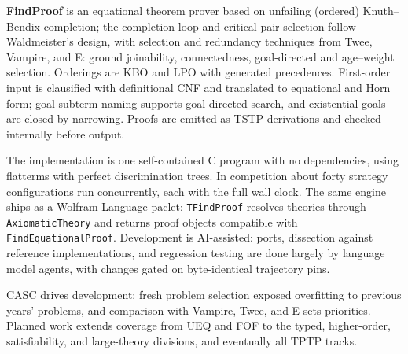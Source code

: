 
{\bf FindProof} \cite{Mur26} is an equational theorem prover based on
unfailing (ordered) Knuth--Bendix completion; the completion loop and
critical-pair selection follow Waldmeister's design, with selection and
redundancy techniques from Twee, Vampire, and E: ground joinability,
connectedness, goal-directed and age--weight selection.  Orderings are KBO
and LPO with generated precedences.  First-order input is clausified with
definitional CNF and translated to equational and Horn form; goal-subterm
naming supports goal-directed search, and existential goals are closed by
narrowing.  Proofs are emitted as TSTP derivations and checked internally
before output.

The implementation is one self-contained C program with no dependencies,
using flatterms with perfect discrimination trees.  In competition about
forty strategy configurations run concurrently, each with the full wall
clock.  The same engine ships as a Wolfram Language paclet:
\texttt{TFindProof} resolves theories through \texttt{AxiomaticTheory} and
returns proof objects compatible with \texttt{FindEquationalProof}.
Development is AI-assisted: ports, dissection against reference
implementations, and regression testing are done largely by language model
agents, with changes gated on byte-identical trajectory pins.

CASC drives development: fresh problem selection exposed overfitting to
previous years' problems, and comparison with Vampire, Twee, and E sets
priorities.  Planned work extends coverage from UEQ and FOF to the typed,
higher-order, satisfiability, and large-theory divisions, and eventually
all TPTP tracks.

%
